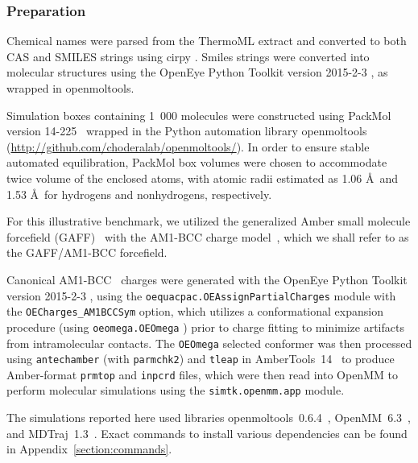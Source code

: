\documentclass[journal=jacsat,manuscript=article]{achemso}
\begin{document}
\subsubsection{Preparation}
\label{section:preparation}

Chemical names were parsed from the ThermoML extract and converted to both CAS and SMILES strings using cirpy \cite{swain2012cirpy}.  Smiles strings were converted into molecular structures using the OpenEye Python Toolkit version 2015-2-3 \cite{openeye}, as wrapped in openmoltools.  

Simulation boxes containing 1~000 molecules were constructed using PackMol version 14-225~\cite{martinez2009packmol, packmolurl} wrapped in the Python automation library openmoltools  (\url{http://github.com/choderalab/openmoltools/}).
In order to ensure stable automated equilibration, PackMol box volumes were chosen to accommodate twice volume of the enclosed atoms, with atomic radii estimated as 1.06 \AA\ and 1.53 \AA\ for hydrogens and nonhydrogens, respectively.  

For this illustrative benchmark, we utilized the generalized Amber small molecule forcefield (GAFF)~\cite{gaff,gaff2} with the AM1-BCC charge model~\cite{am1bcc1,am1bcc2}, which we shall refer to as the GAFF/AM1-BCC forcefield.

Canonical AM1-BCC~\cite{am1bcc1,am1bcc2, velez2014time} charges were generated with the OpenEye Python Toolkit version 2015-2-3 \cite{openeye}, using the {\tt oequacpac.OEAssignPartialCharges} module with the {\tt OECharges\_AM1BCCSym} option, which utilizes a conformational expansion procedure (using {\tt oeomega.OEOmega} \cite{hawkins2012conformer}) prior to charge fitting to minimize artifacts from intramolecular contacts.  
The {\tt OEOmega} selected conformer was then processed using {\tt antechamber} (with {\tt parmchk2}) and {\tt tleap} in AmberTools~14~\cite{amber14} to produce Amber-format {\tt prmtop} and {\tt inpcrd} files, which were then read into OpenMM to perform molecular simulations using the {\tt simtk.openmm.app} module.

The simulations reported here used libraries openmoltools~0.6.4~\cite{openmoltools}, OpenMM~6.3~\cite{eastman2012openmm}, and MDTraj~1.3~\cite{mcgibbon2014mdtraj}.  
Exact commands to install various dependencies can be found in Appendix~\ref{section:commands}.
\end{document}
